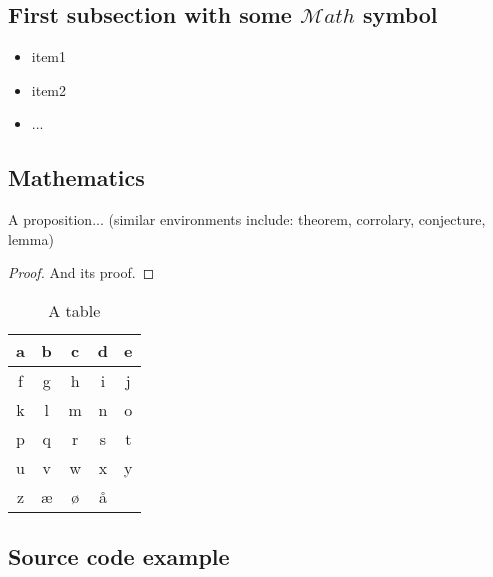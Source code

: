 \subsection{First subsection with some \texorpdfstring{$\mathcal{M}ath$}{Math} symbol}\label{sec:first_ssection}

\blindtext
\begin{itemize}[topsep=-1em,parsep=0em,itemsep=0em] %
 \item item1
 \item item2
 \item ...
\end{itemize}

\subsection{Mathematics}

\blindmathtrue
\blindtext

\begin{proposition}\label{def:a_proposition}
A proposition... (similar environments include: theorem, corrolary, conjecture, lemma)

\end{proposition}

\begin{proof}
\vspace*{-1em} %
And its proof.
\end{proof}

\begin{table}
\caption{\label{tab:example}A table}
\centering
\begin{tabular}[b]{| c | c | c | c | c |}
\hline
a & b & c & d & e \\ \hline
f & g & h & i & j \\ \hline
k & l & m & n & o \\ \hline
p & q & r & s & t \\ \hline
u & v & w & x & y \\ \hline
z & æ & ø & å &   \\ \hline
\end{tabular} 
\end{table}

\subsection{Source code example}

